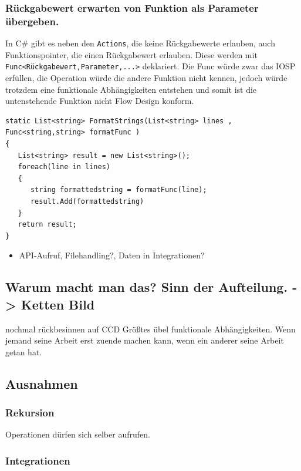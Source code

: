 \documentclass[11pt]{article}
\begin{document}
\subsubsection{Rückgabewert erwarten von Funktion als Parameter übergeben.}
\label{sec:orgheadline34}
In C\# gibt es neben den \texttt{Actions}, die keine Rückgabewerte erlauben, auch Funktionspointer, die einen Rückgabewert erlauben. 
Diese werden mit \texttt{Func<Rückgabewert,Parameter,...>} deklariert.
Die Func würde zwar das IOSP erfüllen, die Operation würde die andere Funktion nicht kennen,
jedoch würde trotzdem eine funktionale Abhängigkeiten entstehen und somit ist die untenstehende Funktion nicht Flow Design konform.

\begin{verbatim}
static List<string> FormatStrings(List<string> lines , Func<string,string> formatFunc )
{
   List<string> result = new List<string>();
   foreach(line in lines)
   {
      string formattedstring = formatFunc(line);
      result.Add(formattedstring) 
   }
   return result;
}
\end{verbatim}


\begin{itemize}
\item API-Aufruf, Filehandling?, Daten in Integrationen?
\end{itemize}
\subsection{Warum macht man das? Sinn der Aufteilung. -> Ketten Bild}
\label{sec:orgheadline36}
nochmal rückbesinnen auf CCD
Größtes übel funktionale Abhängigkeiten.
Wenn jemand seine Arbeit erst zuende machen kann, wenn ein anderer seine Arbeit getan hat.
\subsection{Ausnahmen}
\label{sec:orgheadline41}
\subsubsection{Rekursion}
\label{sec:orgheadline37}
Operationen dürfen sich selber aufrufen.
\subsubsection{Integrationen}
\label{sec:orgheadline40}
\end{document}
